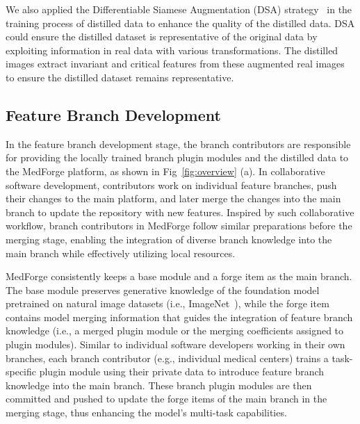 We also applied the Differentiable Siamese Augmentation (DSA) strategy~\cite{zhao2021dataset} in the training process of distilled data to enhance the quality of the distilled data. DSA could ensure the distilled dataset is representative of the original data by exploiting information in real data with various transformations. The distilled images extract invariant and critical features from these augmented real images to ensure the distilled dataset remains representative.

\subsection{Feature Branch Development}
\label{branch}
In the feature branch development stage, the branch contributors are responsible for providing the locally trained branch plugin modules and the distilled data to the MedForge platform, as shown in Fig~\ref{fig:overview} (a).
In collaborative software development, contributors work on individual feature branches, push their changes to the main platform, and later merge the changes into the main branch to update the repository with new features. Inspired by such collaborative workflow, branch contributors in MedForge follow similar preparations before the merging stage, enabling the integration of diverse branch knowledge into the main branch while effectively utilizing local resources.

MedForge consistently keeps a base module and a forge item as the main branch. The base module preserves generative knowledge of the foundation model pretrained on natural image datasets (i.e., ImageNet~\cite{deng2009imagenet}), while the forge item contains model merging information that guides the integration of feature branch knowledge (i.e., a merged plugin module or the merging coefficients assigned to plugin modules). 
Similar to individual software developers working in their own branches, each branch contributor (e.g., individual medical centers) trains a task-specific plugin module using their private data to introduce feature branch knowledge into the main branch. These branch plugin modules are then committed and pushed to update the forge items of the main branch in the merging stage, thus enhancing the model's multi-task capabilities.




